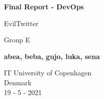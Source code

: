 \begin{titlepage}
    \begin{center}
        \vspace*{1cm}
            
        \Huge
        \textbf{Final Report - DevOps}
            
        \vspace{0.5cm}
        \LARGE
        EvilTwitter
            
        \vspace{1.5cm}
        
        Group E
        
        \textbf{abea, beba, gujo, luka, sena}
            
        \vfill
            
            
        \vspace{0.5cm}
            
          

        \Large
        IT University of Copenhagen\\
        Denmark\\
        19 - 5 - 2021
            
    \end{center}
\end{titlepage}